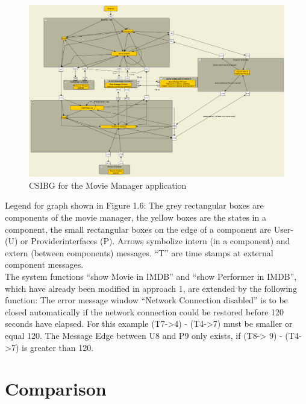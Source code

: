 \begin{figure}[H]
\centering{}\includegraphics[scale=0.7]{../images/Application2_MovieManager}\caption{CSIBG for the Movie Manager application}
\end{figure}
Legend for graph shown in Figure 1.6: The grey rectangular boxes are
components of the movie manager, the yellow boxes are the states in
a component, the small rectangular boxes on the edge of a component
are User- (U) or Providerinterfaces (P). Arrows symbolize intern (in
a component) and extern (between components) messages. \enquote{T}
are time stamps at external component messages. \\
The system functions \enquote{show Movie in IMDB}
and \enquote{show Performer in IMDB}, which have
already been modified in approach 1, are extended by the following
function: The error message window \enquote{Network Connection
disabled} is to be closed automatically if the network
connection could be restored before 120 seconds have elapsed. For
this example (T7-\textgreater 4) - (T4-\textgreater 7) must be smaller
or equal 120. The Message Edge between U8 and P9 only exists, if (T8-\textgreater
9) - (T4-\textgreater 7) is greater than 120.

\section{Comparison\label{sec:Comparison}}

